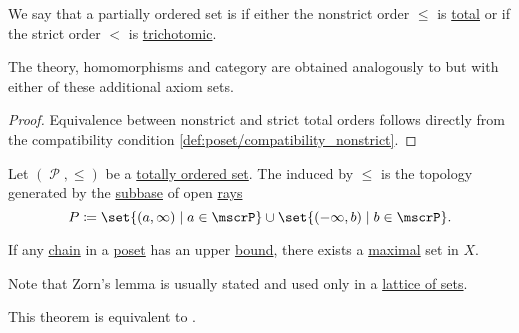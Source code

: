 \begin{definition}\label{def:totally_ordered_set}
  We say that a partially ordered set is  if either the nonstrict order \( \leq \) is \hyperref[def:binary_relation/total]{total} or if the strict order \( < \) is \hyperref[def:binary_relation/trichotomic]{trichotomic}.

  The theory, homomorphisms and category are obtained analogously to  but with either of these additional axiom sets.
\end{definition}
\begin{proof}
  Equivalence between nonstrict and strict total orders follows directly from the compatibility condition \eqref{def:poset/compatibility_nonstrict}.
\end{proof}

\begin{definition}\label{def:order_topology}
  Let \( (\mscrP, \leq) \) be a \hyperref[def:poset]{totally ordered set}. The  induced by \( \leq \) is the topology generated by the \hyperref[def:topological_subbase]{subbase} of open \hyperref[def:poset_interval/ray]{rays}
  \begin{equation*}
    P \coloneqq \set{ (a, \infty) \given a \in \mscrP } \cup \set{ (-\infty, b) \given b \in \mscrP }.
  \end{equation*}
\end{definition}

\begin{lemma}\label{thm:zorns_lemma}
  If any \hyperref[def:poset_chain_and_antichain]{chain} in a \hyperref[def:poset]{poset} has an upper \hyperref[def:preordered_set/upper_and_lower_bounds]{bound}, there exists a \hyperref[def:preordered_set/maximal_and_minimal_element]{maximal} set in \( X \).

  Note that Zorn's lemma is usually stated and used only in a \hyperref[thm:subsets_form_boolean_algebra]{lattice of sets}.

  This theorem is equivalent to .
\end{lemma}
